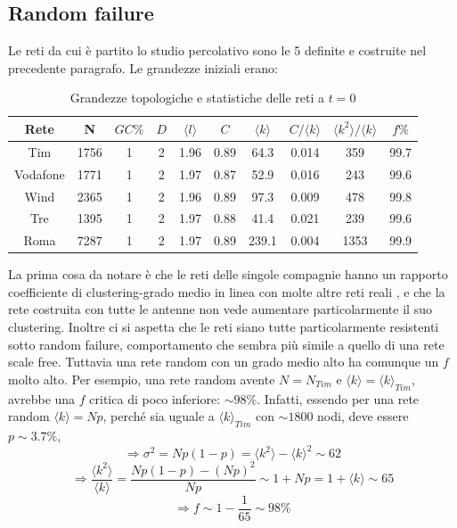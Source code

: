 \subsection{Random failure}
Le reti da cui è partito lo studio percolativo sono le 5 definite e costruite nel precedente paragrafo. Le grandezze iniziali erano:


\begin{table}[ht!]
\centering
	\begin{tabular}{cccccccccc}
	\toprule
	Rete		&N		&$GC\%$	&$D$	&$\langle l\rangle$	&$C$		&$\langle k\rangle$	&$C/\langle k\rangle$	&$\langle k^2\rangle/\langle k\rangle$	&$f\%$\\
	\midrule  
	Tim		&1756	&1		&2	&1.96			&0.89	&64.3			&0.014				&359							&99.7\\
	Vodafone	&1771	&1		&2	&1.97			&0.87	&52.9			&0.016				&243							&99.6\\
	Wind		&2365	&1		&2	&1.96			&0.89	&97.3			&0.009				&478							&99.8\\
	Tre		&1395	&1		&2	&1.97			&0.88	&41.4			&0.021				&239							&99.6\\
	Roma		&7287	&1		&2	&1.97			&0.89	&239.1			&0.004				&1353							&99.9\\
	\bottomrule
	\end{tabular}
\caption{Grandezze topologiche e statistiche delle reti a $t=0$}
\label{tab:datiInitial}
\end{table}

La prima cosa da notare è che le reti delle singole compagnie hanno un rapporto coefficiente di clustering-grado medio in linea con molte altre reti reali \parencite{Barbalbert2002}, e che la rete costruita con tutte le antenne non vede aumentare particolarmente il suo clustering. Inoltre ci si aspetta che le reti siano tutte particolarmente resistenti sotto random failure, comportamento che sembra più simile a quello di una rete scale free. Tuttavia una rete random con un grado medio alto ha comunque un $f$ molto alto. Per esempio, una rete random avente $N = N_{Tim}$ e $\langle k \rangle = \langle k \rangle_{Tim}$, avrebbe una $f$ critica di poco inferiore: $\sim 98\%$. Infatti, essendo per una rete random $\langle k \rangle = Np$, perché sia uguale a $\langle k \rangle_{Tim}$ con $\sim 1800$ nodi, deve essere $p \sim 3.7\%$, 
$$\Rightarrow \sigma^2 = Np(1-p) = \langle k^2 \rangle - \langle k \rangle^2 \sim 62$$
$$\Rightarrow \frac{\langle k^2 \rangle }{\langle k \rangle} = \frac{Np(1-p)-(Np)^2}{Np} \sim 1+Np = 1+ \langle k \rangle \sim 65$$
$$\Rightarrow f \sim 1 - \frac{1}{65} \sim 98\%$$


